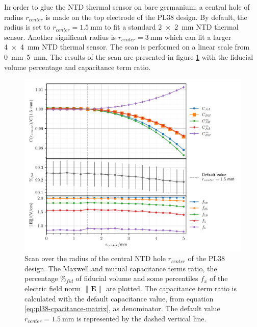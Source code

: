 In order to glue the NTD thermal sensor on bare germanium, a central hole of radius $r_{center}$ is made on the top electrode of the PL38 design. By default, the radius is set to $r_{center} = \SI{1.5}{\mm}$ to fit a standard \SI{2 x 2}{\mm} NTD thermal sensor. Another significant radius is $r_{center}=\SI{3}{\mm}$ which can fit a larger \SI{4 x 4}{\mm} NTD thermal sensor. The scan is performed on a linear scale from \SIrange{0}{5}{\mm}. The results of the scan are presented in figure \ref{fig:capacitance-fiducial-r-center-pl38} with the fiducial volume percentage and capacitance term ratio.

\begin{figure}
\centering
\includegraphics[scale=1]{Figures/ElectrodesScan/capacitance_fiducial_r_center_pl38.pdf}
\caption{Scan over the radius of the central NTD hole $r_{center}$ of the PL38 design. The Maxwell and mutual capacitance terms ratio, the percentage $\%_{fid}$ of fiducial volume and some percentiles $f_x$ of the electric field norm $\| \mathbf{E} \|$ are plotted. The capacitance term ratio is calculated with the default capacitance value, from equation \ref{eq:pl38-cpacitance-matrix}, as denominator. The default value $r_{center}=\SI{1.5}{\mm}$ is represented by the dashed vertical line.}
\label{fig:capacitance-fiducial-r-center-pl38}
\end{figure}

